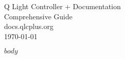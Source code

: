 \documentclass[11pt]{article}
\begin{document}
\begin{titlepage}
    \pagestyle{empty}
    \protect\thispagestyle{empty}

    \begin{center}
        \vfill
        {\Huge Q Light Controller + Documentation} \\
        {\LARGE Comprehensive Guide} \\
        \vfill
        {\Large docs.qlcplus.org} \\
        \vfill
        {\Large \today}  %
    \end{center}
\end{titlepage}

$body$
\end{document}
